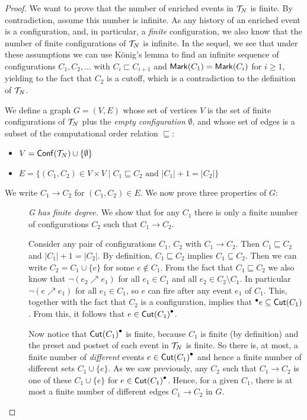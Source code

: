 \documentclass{article}
\newcommand{\conf}[1]{\ensuremath{\mathsf{Conf}(#1)}}
\begin{document}
\begin{proof}
We want to prove that the number of enriched events in $\mathcal{T}_{N}$ is finite.
By contradiction, assume this number is infinite. As any history of an enriched
event is a configuration, and, in particular, a \emph{finite} configuration, we
also know that the number of finite configurations of $\mathcal{T}_{N}$ is infinite.
In the sequel, we see that under these assumptions we can use K\"{o}nig's lemma
to find an infinite sequence of configurations $C_1, C_2, \ldots$ with $C_i
\sqsubset C_{i+1}$ and $\mathsf{Mark }{(C_1)} = \mathsf{Mark }{(C_i)}$ for $i \ge 1$, yielding
to the fact that $C_2$ is a cutoff, which is a contradiction to the definition
of $\mathcal{T}_{N}$.

We define a graph $G = (V, E)$ whose set of vertices $V$ is the set of finite
configurations of $\mathcal{T}_{N}$ plus the \textit{empty configuration}
$\emptyset$, and whose set of edges is a subset of the computational order
relation $\sqsubseteq$:

\begin{itemize}
\item $V = \conf{\trunc{N}} \cup \{\emptyset\}$ 
\item $E = \{(C_1, C_2) \in V \times V \mid C_1 \sqsubseteq C_2 \text{ and }
|C_1| + 1 = |C_2|\}$
\end{itemize}

We write $C_1 \to C_2$ for $(C_1, C_2) \in E$.  We now prove three properties
of $G$:

\begin{description}
\item[] \emph{G has finite degree.}  We show that for any $C_1$ there is only a
finite number of configurations $C_2$ such that $C_1 \to C_2$.

Consider any pair of configurations $C_1$, $C_2$ with $C_1 \to C_2$.  Then $C_1
\sqsubseteq C_2$ and $|C_1| + 1 = |C_2|$.  By definition, $C_1 \sqsubseteq C_2$
implies $C_1 \subseteq C_2$.  Then we can write $C_2 = C_1 \cup \{e\}$ for some
$e \notin C_1$.  From the fact that $C_1 \sqsubseteq C_2$ we also know that
$\lnot (e_2 \nearrow e_1)$ for all $e_1 \in C_1$ and all $e_2 \in C_2 \setminus
C_1$.  In particular $\lnot (e \nearrow e_1)$ for all $e_1 \in C_1$, so $e$ can
fire after any event $e_1$ of $C_1$.  This, together with the fact that $C_2$
is a configuration, implies that ${}^\bullet e \subseteq \mathsf{Cut }{(C_1)}$. From this, it
follows that $e \in \mathsf{Cut }{(C_1)}^\bullet$.

Now notice that $\mathsf{Cut }{(C_1)}^\bullet$ is finite, because $C_1$ is finite (by
definition) and the preset and postset of each event in $\mathcal{T}_{N}$ is finite.
So there is, at most, a finite number of \emph{different} events $e \in
\mathsf{Cut }{(C_1)}^\bullet$ and hence a finite number of different sets $C_1 \cup \{e\}$.
As we saw previously, any $C_2$ such that $C_1 \to C_2$ is one of these $C_1
\cup \{e\}$ for $e \in \mathsf{Cut }{(C_1)}^\bullet$.  Hence, for a given $C_1$, there is
at most a finite number of different edges $C_1 \to C_2$ in $G$.


\end{description}
\end{proof}
\end{document}
